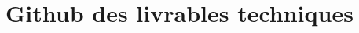 \documentclass[12pt,twoside]{book}
\begin{document}
	
\newpage{\pagestyle{empty}\cleardoublepage}
	







\appendix %

\chapter[Github des livrables techniques]{Github des livrables techniques}



\newpage{\pagestyle{empty}\cleardoublepage}


\backmatter %

\printindex
\printglossaries
\listoffigures
\tableofcontents
\end{document}
